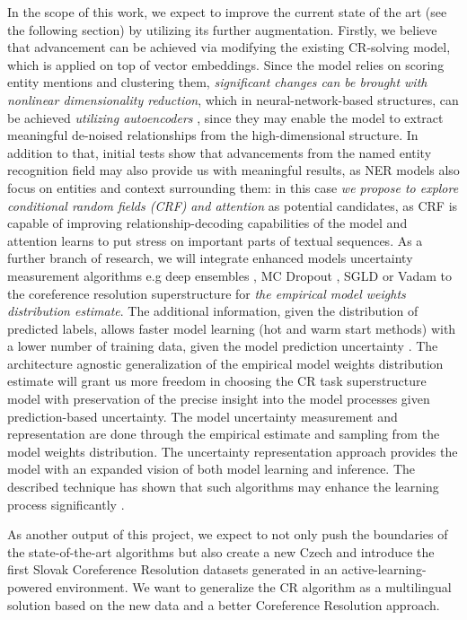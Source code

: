 In the scope of this work, we expect to improve the current state of the art (see the following section) by utilizing its further augmentation. 
Firstly, we believe that advancement can be achieved via modifying the existing CR-solving model, which is applied on top of vector embeddings. 
Since the model relies on scoring entity mentions and clustering them, \textit{significant changes can be brought with nonlinear dimensionality reduction}, which in neural-network-based structures, can be achieved \textit{utilizing autoencoders} \cite{autoencoders-Zabalza2016,autoencoders-Sahay2019}, since they may enable the model to extract meaningful de-noised relationships from the high-dimensional structure. 
In addition to that, initial tests show that advancements from the named entity recognition field may also provide us with meaningful results, as NER models also focus on entities and context surrounding them: in this case \textit{we propose to explore conditional random fields (CRF)} \cite{ner-Strakova2019,ner-Zhanming2019,ner-Zhanming2019} \textit{and attention} \cite{ner-Yamada2020} as potential candidates, as CRF is capable of improving relationship-decoding capabilities of the model and attention learns to put stress on important parts of textual sequences. 
As a further branch of research, we will integrate enhanced models uncertainty measurement algorithms e.g deep ensembles \cite{lakshminarayanan2016simple}, MC Dropout \cite{gal2017deep}, SGLD \cite{welling2011bayesian} or Vadam \cite{khan2018fast} to the coreference resolution superstructure for \textit{the empirical model weights distribution estimate}. The additional information, given the distribution of predicted labels, allows faster model learning (hot and warm start methods) with a lower number of training data, given the model prediction uncertainty \cite{sahan2021active}. The architecture agnostic generalization of the empirical model weights distribution estimate will grant us more freedom in choosing the CR task superstructure model with preservation of the precise insight into the model processes given prediction-based uncertainty.
The model uncertainty measurement and representation are done through the empirical estimate and sampling from the model weights distribution. 
The uncertainty representation approach provides the model with an expanded vision of both model learning and inference. 
The described technique has shown that such algorithms may enhance the learning process significantly \cite{ovadia2019can}.

As another output of this project, we expect to not only push the boundaries of the state-of-the-art algorithms but also create a new Czech and introduce the first Slovak Coreference Resolution datasets generated in an active-learning-powered environment.
We want to generalize the CR algorithm as a multilingual solution based on the new data and a better Coreference Resolution approach.


